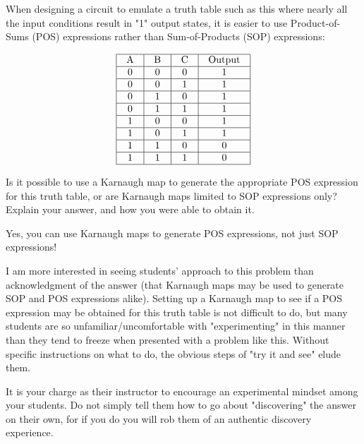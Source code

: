 

When designing a circuit to emulate a truth table such as this where nearly all the input conditions result in "1" output states, it is easier to use Product-of-Sums (POS) expressions rather than Sum-of-Products (SOP) expressions:


$$\vbox{\offinterlineskip
\halign{\strut
\vrule \quad\hfil # \ \hfil & 
\vrule \quad\hfil # \ \hfil & 
\vrule \quad\hfil # \ \hfil & 
\vrule \quad\hfil # \ \hfil \vrule \cr
\noalign{\hrule}
%
A & B & C & Output \cr
%
\noalign{\hrule}
%
0 & 0 & 0 & 1 \cr
%
\noalign{\hrule}
%
0 & 0 & 1 & 1 \cr
%
\noalign{\hrule}
%
0 & 1 & 0 & 1 \cr
%
\noalign{\hrule}
%
0 & 1 & 1 & 1 \cr
%
\noalign{\hrule}
%
1 & 0 & 0 & 1 \cr
%
\noalign{\hrule}
%
1 & 0 & 1 & 1 \cr
%
\noalign{\hrule}
%
1 & 1 & 0 & 0 \cr
%
\noalign{\hrule}
%
1 & 1 & 1 & 0 \cr
%
\noalign{\hrule}
} %
}$$ %

Is it possible to use a Karnaugh map to generate the appropriate POS expression for this truth table, or are Karnaugh maps limited to SOP expressions only?  Explain your answer, and how you were able to obtain it.







Yes, you can use Karnaugh maps to generate POS expressions, not just SOP expressions!







I am more interested in seeing students' approach to this problem than acknowledgment of the answer (that Karnaugh maps may be used to generate SOP and POS expressions alike).  Setting up a Karnaugh map to see if a POS expression may be obtained for this truth table is not difficult to do, but many students are so unfamiliar/uncomfortable with "experimenting" in this manner than they tend to freeze when presented with a problem like this.  Without specific instructions on what to do, the obvious steps of "try it and see" elude them.

It is your charge as their instructor to encourage an experimental mindset among your students.  Do not simply tell them how to go about "discovering" the answer on their own, for if you do you will rob them of an authentic discovery experience.




